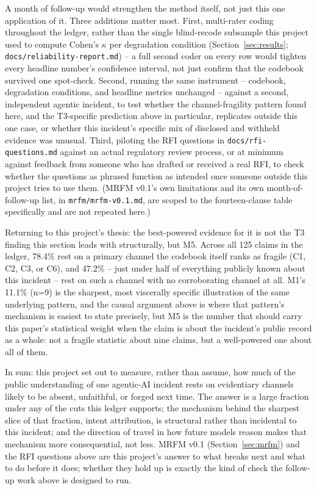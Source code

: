 A month of follow-up would strengthen the method itself, not just this one
application of it. Three additions matter most. First, multi-rater coding
throughout the ledger, rather than the single blind-recode subsample this
project used to compute Cohen's $\kappa$ per degradation condition
(Section~\ref{sec:results}; \texttt{docs/reliability-report.md}) -- a full
second coder on every row would tighten every headline number's confidence
interval, not just confirm that the codebook survived one spot-check.
Second, running the same instrument -- codebook, degradation conditions, and
headline metrics unchanged -- against a second, independent agentic
incident, to test whether the channel-fragility pattern found here, and the
T3-specific prediction above in particular, replicates outside this one
case, or whether this incident's specific mix of disclosed and withheld
evidence was unusual. Third, piloting the RFI questions in
\texttt{docs/rfi-questions.md} against an actual regulatory review process,
or at minimum against feedback from someone who has drafted or received a
real RFI, to check whether the questions as phrased function as intended
once someone outside this project tries to use them. (MRFM v0.1's own
limitations and its own month-of-follow-up list, in
\texttt{mrfm/mrfm-v0.1.md}, are scoped to the fourteen-clause table
specifically and are not repeated here.)

Returning to this project's thesis: the best-powered evidence for it is not
the T3 finding this section leads with structurally, but M5. Across all 125
claims in the ledger, 78.4\% rest on a primary channel the codebook itself
ranks as fragile (C1, C2, C3, or C6), and 47.2\% -- just under half of
everything publicly known about this incident -- rest on such a channel with
no corroborating channel at all. M1's 11.1\% (n=9) is the sharpest, most
viscerally specific illustration of the same underlying pattern, and the
causal argument above is where that pattern's mechanism is easiest to state
precisely, but M5 is the number that should carry this paper's statistical
weight when the claim is about the incident's public record as a whole: not
a fragile statistic about nine claims, but a well-powered one about all of
them.

In sum: this project set out to measure, rather than assume, how much of the
public understanding of one agentic-AI incident rests on evidentiary
channels likely to be absent, unfaithful, or forged next time. The answer is
a large fraction under any of the cuts this ledger supports; the mechanism
behind the sharpest slice of that fraction, intent attribution, is
structural rather than incidental to this incident; and the direction of
travel in how future models reason makes that mechanism more consequential,
not less. MRFM v0.1 (Section~\ref{sec:mrfm}) and the RFI questions above are
this project's answer to what breaks next and what to do before it does;
whether they hold up is exactly the kind of check the follow-up work above
is designed to run.

